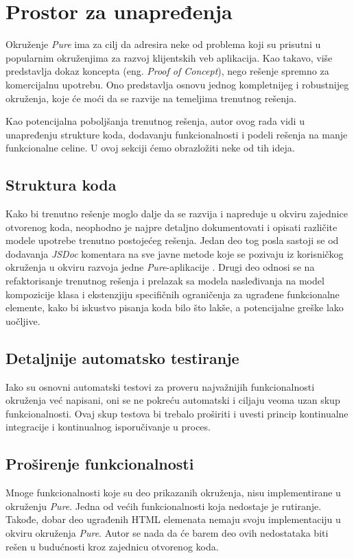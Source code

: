 \documentclass[12pt,oneside]{memoir}
\begin{document}
\section{Prostor za unapređenja}
Okruženje \emph{Pure} ima za cilj da adresira neke od problema koji
su prisutni u popularnim okruženjima za razvoj klijentskih veb aplikacija.
Kao takavo, više predstavlja dokaz koncepta (eng. \emph{Proof of Concept}),
nego rešenje spremno za komercijalnu upotrebu. Ono predstavlja
osnovu jednog kompletnijeg i robustnijeg okruženja, koje će
moći da se razvije na temeljima trenutnog rešenja.

Kao potencijalna
poboljšanja trenutnog rešenja, autor ovog rada vidi u unapređenju
strukture koda, dodavanju funkcionalnosti i podeli rešenja na manje
funkcionalne celine. U ovoj sekciji ćemo obrazložiti neke od tih
ideja.
\subsection{Struktura koda}
Kako bi trenutno rešenje moglo dalje da se razvija i napreduje u
okviru zajednice otvorenog koda, neophodno je najpre detaljno
dokumentovati i opisati različite modele upotrebe trenutno
postojećeg rešenja. Jedan deo tog posla sastoji se od dodavanja
\emph{JSDoc} komentara na sve javne metode koje se pozivaju iz
korisničkog okruženja u okviru razvoja jedne
\emph{Pure}-aplikacije \cite{JSDoc}. Drugi deo odnosi se na refaktorisanje
trenutnog rešenja i prelazak sa modela nasleđivanja na model
kompozicije klasa i ekstenzjiju specifičnih ograničenja za ugrađene
funkcionalne elemente, kako bi iskustvo pisanja koda bilo što lakše,
a potencijalne greške lako uočljive.

\subsection{Detaljnije automatsko testiranje}
Iako su osnovni automatski testovi za proveru najvažnijih
funkcionalnosti okruženja već napisani, oni se ne pokreću
automatski i ciljaju veoma uzan skup funkcionalnosti. Ovaj skup
testova bi trebalo proširiti i uvesti princip kontinualne
integracije i kontinualnog isporučivanje u proces.

\subsection{Proširenje funkcionalnosti}
Mnoge funkcionalnosti koje su deo prikazanih okruženja, nisu implementirane u okruženju
\emph{Pure}. Jedna od većih funkcionalnosti koja nedostaje je rutiranje.
Takođe, dobar deo ugrađenih HTML elemenata
nemaju svoju implementaciju u okviru okruženja \emph{Pure}. Autor se nada da će barem deo
ovih nedostataka biti rešen u budućnosti kroz zajednicu otvorenog koda.
\end{document}
